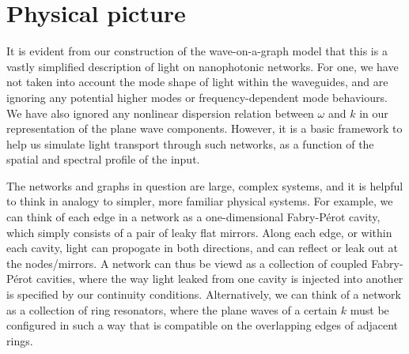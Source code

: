 \pagebreak

\section{Physical picture}
\label{sec:physical_picture}
It is evident from our construction of the wave-on-a-graph model that this is a vastly simplified description of light on nanophotonic networks. For one, we have not taken into account the mode shape of light within the waveguides, and are ignoring any potential higher modes or frequency-dependent mode behaviours. We have also ignored any nonlinear dispersion relation between $\omega$ and $k$ in our representation of the plane wave components. However, it is a basic framework to help us simulate light transport through such networks, as a function of the spatial and spectral profile of the input.

The networks and graphs in question are large, complex systems, and it is helpful to think in analogy to simpler, more familiar physical systems. For example, we can think of each edge in a network as a one-dimensional Fabry-P\'erot cavity, which simply consists of a pair of leaky flat mirrors. Along each edge, or within each cavity, light can propogate in both directions, and can reflect or leak out at the nodes/mirrors. A network can thus be viewd as a collection of coupled Fabry-P\'erot cavities, where the way light leaked from one cavity is injected into another is specified by our continuity conditions. Alternatively, we can think of a network as a collection of ring resonators, where the plane waves of a certain $k$ must be configured in such a way that is compatible on the overlapping edges of adjacent rings.


